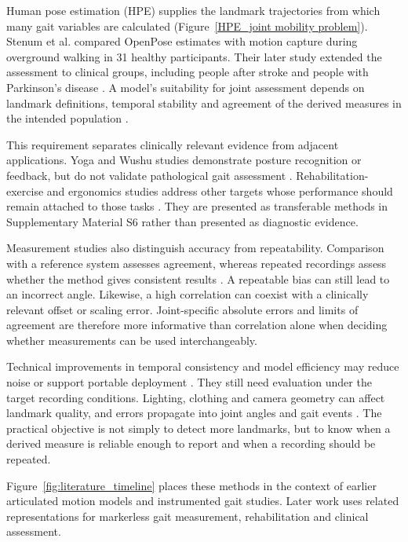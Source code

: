 \documentclass[12pt,nopreprintline]{elsarticle}
\begin{document}
\begin{revision}
Human pose estimation (HPE) supplies the landmark trajectories from which many gait variables are calculated (Figure~\ref{HPE_joint mobility problem}). Stenum et al. \cite{stenum2021two} compared OpenPose estimates with motion capture during overground walking in 31 healthy participants. Their later study extended the assessment to clinical groups, including people after stroke and people with Parkinson's disease \cite{stenum2024clinical}. A model's suitability for joint assessment depends on landmark definitions, temporal stability and agreement of the derived measures in the intended population \cite{wang2024markerless}.

This requirement separates clinically relevant evidence from adjacent applications. Yoga and Wushu studies demonstrate posture recognition or feedback, but do not validate pathological gait assessment \cite{ma2022wushu,sharma2022surya}. Rehabilitation-exercise and ergonomics studies address other targets whose performance should remain attached to those tasks \cite{marusic2023evaluating,doong2025predicting}. They are presented as transferable methods in Supplementary Material S6 rather than presented as diagnostic evidence.

Measurement studies also distinguish accuracy from repeatability. Comparison with a reference system assesses agreement, whereas repeated recordings assess whether the method gives consistent results \cite{van2023accuracy,schoenwether2025reliability}. A repeatable bias can still lead to an incorrect angle. Likewise, a high correlation can coexist with a clinically relevant offset or scaling error. Joint-specific absolute errors and limits of agreement are therefore more informative than correlation alone when deciding whether measurements can be used interchangeably.

Technical improvements in temporal consistency and model efficiency may reduce noise or support portable deployment \cite{sheu2023improvement,li2020human,yan2025efficient}. They still need evaluation under the target recording conditions. Lighting, clothing and camera geometry can affect landmark quality, and errors propagate into joint angles and gait events \cite{viswakumar2019human,wang2024markerless}. The practical objective is not simply to detect more landmarks, but to know when a derived measure is reliable enough to report and when a recording should be repeated.
\end{revision}

Figure~\ref{fig:literature_timeline} places these methods in the context of earlier articulated motion models and instrumented gait studies. Later work uses related representations for markerless gait measurement, rehabilitation and clinical assessment.

\end{document}
